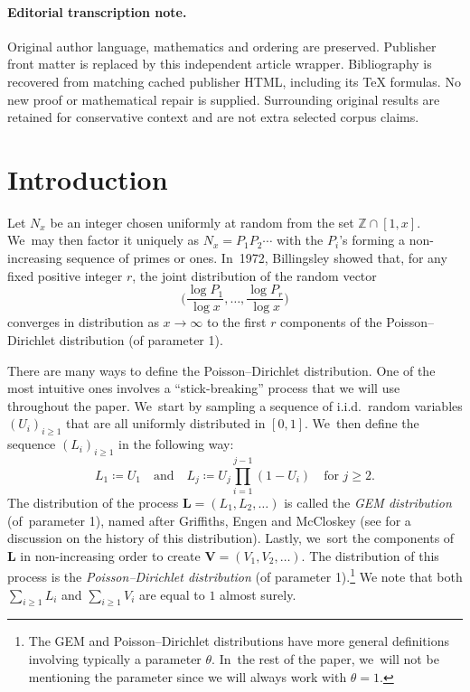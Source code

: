 \documentclass[11pt]{article}
\newcommand{\bL}{{\boldsymbol L}}
\newcommand{\bV}{{\boldsymbol V}}
\newcommand{\ZZ}{\mathbb{Z}}
\newcommand{\bgg}{\Big}
\theoremstyle{plain}
\theoremstyle{definition}
\begin{document}
\paragraph{Editorial transcription note.}
Original author language, mathematics and ordering are preserved. Publisher front matter is replaced by this independent article wrapper. Bibliography is recovered from matching cached publisher HTML, including its TeX formulas. No new proof or mathematical repair is supplied. Surrounding original results are retained for conservative context and are not extra selected corpus claims.
\clearpage

\section{Introduction}
\label{sec:intro}

Let $N_x$ be an integer chosen uniformly at random from the set $\ZZ \cap [1, x]$. We~may then factor it uniquely as $N_x = P_1P_2 \cdots$ with the $P_i$'s forming a non-increasing sequence of primes or ones. In~1972, Billingsley \cite{Bill72} showed that, for any fixed positive integer $r$, the joint distribution of the random vector
\[
\bgg(\frac{\log P_1}{\log x}, \ldots, \frac{\log P_r}{\log x}\bgg)
\]
converges in distribution as $x \to \infty$ to the first $r$ components of the Poisson--Dirichlet distribution (of parameter 1).

There are many ways to define the Poisson--Dirichlet distribution. One of the most intuitive ones involves a ``stick-breaking'' process that we will use throughout the paper. We~start by sampling a sequence of i.i.d.~random variables $(U_i)_{i \ge 1}$ that are all uniformly distributed in $[0, 1]$. We~then define the sequence $(L_i)_{i \ge 1}$ in the following way:
\[
L_1 \coloneqq U_1 \quad \text{and}\quad L_j \coloneqq U_j \prod_{i=1}^{j-1} (1-U_i) \quad \text{for $j \ge 2$.}
\]
The distribution of the process $\bL = (L_1, L_2, \ldots)$ is called the \textit{GEM distribution} (of~parameter 1), named after Griffiths, Engen and McCloskey (see \cite[Ch.\,41]{JKB} for a discussion on the history of this distribution). Lastly, we~sort the components of $\bL$ in non-increasing order to create $\bV = (V_1, V_2, \ldots)$. The distribution of this process is the \textit{Poisson--Dirichlet distribution} (of parameter 1).\footnote{The GEM and Poisson--Dirichlet distributions have more general definitions involving typically a parameter $\theta$. In~the rest of the paper, we~will not be mentioning the parameter since we will always work with $\theta = 1$.} We note that both $\sum_{i \ge 1} L_i$ and $\sum_{i \ge 1} V_i$ are equal to $1$ almost surely.
\end{document}
